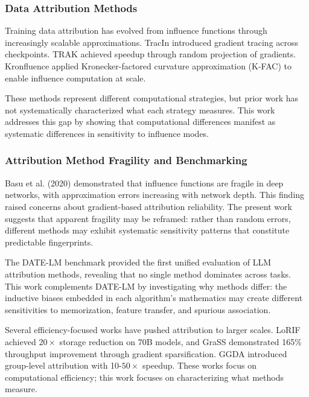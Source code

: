 
\subsubsection{Data Attribution Methods}

Training data attribution has evolved from influence functions \citep{koh2017understanding} through increasingly scalable approximations. TracIn \citep{pruthi2020tracin} introduced gradient tracing across checkpoints. TRAK \citep{park2023trak} achieved speedup through random projection of gradients. Kronfluence \citep{grosse2023kronfluence} applied Kronecker-factored curvature approximation (K-FAC) to enable influence computation at scale.

These methods represent different computational strategies, but prior work has not systematically characterized what each strategy measures. This work addresses this gap by showing that computational differences manifest as systematic differences in sensitivity to influence modes.

\subsubsection{Attribution Method Fragility and Benchmarking}

Basu et al. (2020) demonstrated that influence functions are fragile in deep networks, with approximation errors increasing with network depth. This finding raised concerns about gradient-based attribution reliability. The present work suggests that apparent fragility may be reframed: rather than random errors, different methods may exhibit systematic sensitivity patterns that constitute predictable fingerprints.

The DATE-LM benchmark \citep{jiao2025datelm} provided the first unified evaluation of LLM attribution methods, revealing that no single method dominates across tasks. This work complements DATE-LM by investigating why methods differ: the inductive biases embedded in each algorithm's mathematics may create different sensitivities to memorization, feature transfer, and spurious association.

Several efficiency-focused works have pushed attribution to larger scales. LoRIF \citep{li2026lorif} achieved $20\times$ storage reduction on 70B models, and GraSS \citep{hu2025grass} demonstrated 165\% throughput improvement through gradient sparsification. GGDA \citep{ley2024ggda} introduced group-level attribution with 10-$50\times$ speedup. These works focus on computational efficiency; this work focuses on characterizing what methods measure.

